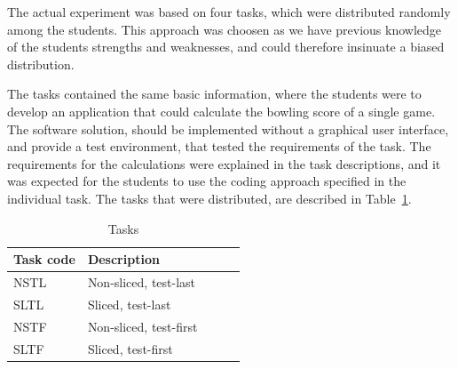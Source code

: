 \documentclass{sig-alternate-05-2015}
\begin{document}
The actual experiment was based on four tasks, which were distributed randomly among the students. This approach was choosen as we have previous knowledge of the students strengths and weaknesses, and could therefore insinuate a biased distribution.

The tasks contained the same basic information, where the students were to develop an application that could calculate the bow\-ling score of a single game. The software solution, should be implemented without a graphical user interface, and provide a test environment, that tested the requirements of the task. The requirements for the calculations were explained in the task descriptions, and it was expected for the students to use the coding approach specified in the individual task.
The tasks that were distributed, are described in Table~\ref{TaskTable}.

\begin{table}[!ht]
\centering
\caption{Tasks}
\label{TaskTable}
\begin{tabular}{|l|p{0.68\linewidth}|}
\hline
\textbf{Task code} & \textbf{Description} \\
\hline
\hline
NSTL & Non-sliced, test-last \\
SLTL & Sliced, test-last \\
NSTF & Non-sliced, test-first \\
SLTF & Sliced, test-first\\
\hline
\end{tabular}
\end{table}
\end{document}
